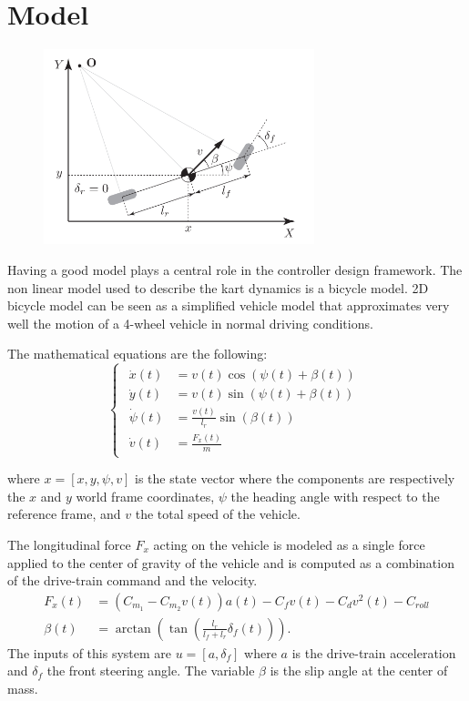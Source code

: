 \documentclass[a4paper,12pt,oneside]{book}
\begin{document}
\section{Model}
\begin{figure}[h!]
	\centering
	\includegraphics[width=0.7\textwidth]{Bycicle_scheme.png}
\end{figure}
Having a good model plays a central role in the controller design framework.
The non linear model used to describe the kart dynamics is a bicycle model.
2D bicycle model can be seen as a simplified vehicle model that approximates very well the motion of a 4-wheel vehicle in normal driving conditions.

The mathematical equations are the following:
\begin{equation}
\begin{cases}
 	\begin{aligned}
		\dot{x}(t) &= v(t) \cos(\psi(t) + \beta(t)) \\
		\dot{y}(t) &= v(t) \sin(\psi(t) + \beta(t)) \\
		\dot{\psi}(t) &= \frac{v(t)}{l_r} \sin(\beta(t)) \\
		\dot{v}(t) &= \frac{F_x(t)}{m} 
	\end{aligned}
\end{cases}
\label{Plant}
\end{equation}

where $x = [x, y, \psi, v]$ is the state vector where the components are respectively the $x$ and $y$ world frame coordinates, $\psi$ the heading angle with respect to the reference frame, and $v$ the total speed of the vehicle.

The longitudinal force $F_x$ acting on the vehicle is modeled as a single force applied to the center of gravity of the vehicle and is computed as a combination of the drive-train command and the velocity. 
\begin{align}
    F_x (t) &= (C_{m_1} - C_{m_2} v(t)) a(t) - C_f v(t) - C_d v^2(t) - C_{roll} \label{eq:Long_force}\\
    \beta(t) &= \arctan\left(\tan\left(\frac{l_r}{l_f+l_r}\delta_f(t)\right) \right).
\end{align}
The inputs of this system are $u = [a, \delta_f]$ where $a$ is the drive-train acceleration and $\delta_f$ the front steering angle. 
The variable $\beta$ is the slip angle at the center of mass. 
\end{document}
